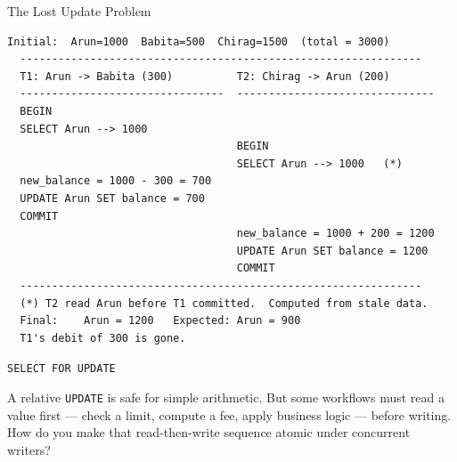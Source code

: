 \documentclass[aspectratio=169,10pt]{beamer}
\begin{document}
\begin{frame}[fragile]{The Lost Update Problem}

\begin{lstlisting}[style=ascii]
  Initial:  Arun=1000  Babita=500  Chirag=1500  (total = 3000)
  ---------------------------------------------------------------
  T1: Arun -> Babita (300)          T2: Chirag -> Arun (200)
  --------------------------------  -------------------------------
  BEGIN
  SELECT Arun --> 1000
                                    BEGIN
                                    SELECT Arun --> 1000   (*)
  new_balance = 1000 - 300 = 700
  UPDATE Arun SET balance = 700
  COMMIT
                                    new_balance = 1000 + 200 = 1200
                                    UPDATE Arun SET balance = 1200
                                    COMMIT
  ---------------------------------------------------------------
  (*) T2 read Arun before T1 committed.  Computed from stale data.
  Final:    Arun = 1200   Expected: Arun = 900
  T1's debit of 300 is gone.
\end{lstlisting}

\end{frame}

\begin{frame}{\texttt{SELECT FOR UPDATE}}

  \begin{block}{}
    A relative \texttt{UPDATE} is safe for simple arithmetic.
    But some workflows must read a value first --- check a limit,
    compute a fee, apply business logic --- before writing.\\[0.4em]
    How do you make that read-then-write sequence atomic under
    concurrent writers?
  \end{block}

\end{frame}
\end{document}
